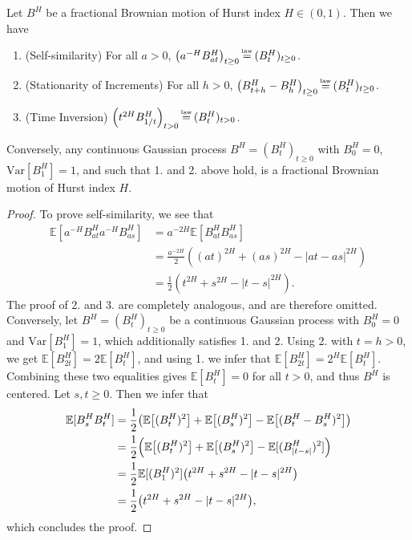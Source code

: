  \begin{prop}\label{prop212}
     Let $B^{H}$ be a fractional Brownian motion of Hurst index $H\in (0,1)$. Then we have
     \begin{enumerate}
         \item (Self-similarity) For all $a>0$, $\left(a^{-H}B^{H}_{at}\right)_{t\geq 0}\mylaw(B_{t}^{H})_{t\geq 0}$.
         \item (Stationarity of Increments) For all $h>0$, $\left(B_{t+h}^{H}-B_{h}^{H}\right)_{t\geq 0}\mylaw (B_{t}^{H})_{t\geq 0}$.
         \item (Time Inversion) $\left(t^{2H}B^{H}_{1/t}\right)_{t>0}\mylaw (B_{t}^{H})_{t>0}$.
     \end{enumerate}
     Conversely, any continuous Gaussian process $B^{H}=(B_{t}^{H})_{t\geq 0}$ with $B_{0}^{H}=0$, $\textrm{Var}[B_{1}^{H}]=1$, and such that 1. and 2. above hold, is a fractional Brownian motion of Hurst index $H$.
 \end{prop}
 \begin{proof}
 To prove self-similarity, we see that
     \begin{align}
         \mathbb{E}\left[a^{-H}B_{at}^{H}a^{-H}B_{as}^{H}\right]&=a^{-2H}\mathbb{E}[B_{at}^{H}B_{as}^{H}]\\
         &=\frac{a^{-2H}}{2}\left((at)^{2H}+(as)^{2H}-|at-as|^{2H}\right)\\
         &= \frac{1}{2}(t^{2H}+s^{2H}-|t-s|^{2H}).
     \end{align}
     The proof of 2. and 3. are completely analogous, and are therefore omitted. Conversely, let $B^{H}=(B_{t}^{H})_{t\geq 0}$ be a continuous Gaussian process with $B^{H}_{0}=0$ and $\textrm{Var}[B_{1}^{H}]=1$, which additionally satisfies 1. and 2. Using 2. with $t=h>0$, we get $\mathbb{E}[B_{2t}^{H}]=2\mathbb{E}[B_{t}^{H}]$, and using 1. we infer that $\mathbb{E}[B_{2t}^{H}]=2^{H}\mathbb{E}[B_{t}^{H}]$. Combining these two equalities gives $\mathbb{E}[B_{t}^{H}]=0$ for all $t>0$, and thus $B^{H}$ is centered. Let $s,t\geq 0$. Then we infer that
     \begin{align}
         \E[B_{s}^{H}B_{t}^{H}]&=\frac{1}{2}\left(\E\left[(B_{t}^{H})^{2}\right]+\E\left[(B_{s}^{H})^{2}\right]-\E\left[(B_{t}^{H}-B_{s}^{H})^{2}\right]\right)\\
         &= \frac{1}{2}\left(\E\left[(B_{t}^{H})^{2}\right]+\E\left[(B_{s}^{H})^{2}\right]-\E[(B_{|t-s|}^{H})^{2}]\right)\\
         &= \frac{1}{2}\E[(B_{1}^{H})^{2}]\left(t^{2H}+s^{2H}-|t-s|^{2H}\right)\\
         &= \frac{1}{2}\left(t^{2H}+s^{2H}-|t-s|^{2H}\right),
     \end{align}
     which concludes the proof.
 \end{proof}
